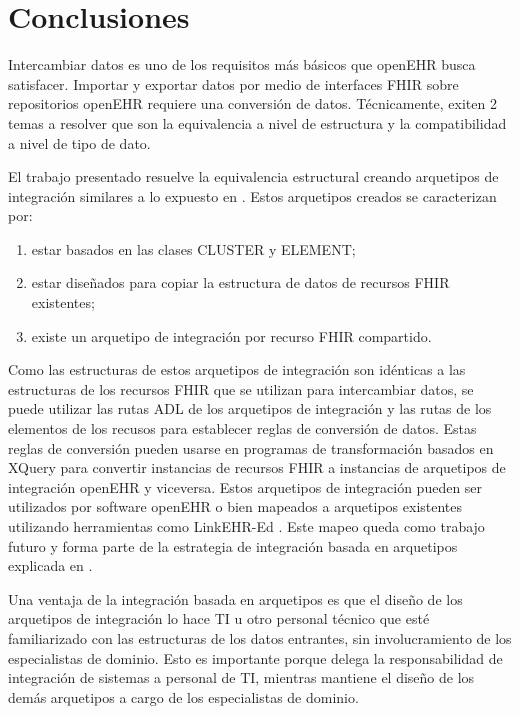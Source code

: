 \chapter{Conclusiones}

Intercambiar datos es uno de los requisitos más básicos que openEHR busca satisfacer. Importar y exportar datos por medio de interfaces FHIR sobre repositorios openEHR requiere una conversión de datos. Técnicamente, exiten 2 temas a resolver que son la equivalencia a nivel de estructura y la compatibilidad a nivel de tipo de dato.

El trabajo presentado resuelve la equivalencia estructural creando arquetipos de integración similares a lo expuesto en \cite{openEHRArchitecture}. Estos arquetipos creados se caracterizan por:

\begin{enumerate}
  \item estar basados en las clases CLUSTER y ELEMENT;
  \item estar diseñados para copiar la estructura de datos de recursos FHIR existentes;
  \item existe un arquetipo de integración por recurso FHIR compartido.
\end{enumerate}

Como las estructuras de estos arquetipos de integración son idénticas a las estructuras de los recursos FHIR que se utilizan para intercambiar datos, se puede utilizar las rutas ADL de los arquetipos de integración y las rutas de los elementos de los recusos para establecer reglas de conversión de datos. Estas reglas de conversión pueden usarse en programas de transformación basados en XQuery para convertir instancias de recursos FHIR a instancias de arquetipos de integración openEHR y viceversa. Estos arquetipos de integración pueden ser utilizados por software openEHR o bien mapeados a arquetipos existentes utilizando herramientas como LinkEHR-Ed \cite{Maldonado09}. Este mapeo queda como trabajo futuro y forma parte de la estrategia de integración basada en arquetipos explicada en \cite{openEHRIntegration}.

Una ventaja de la integración basada en arquetipos es que el diseño de los arquetipos de integración lo hace TI u otro personal técnico que esté familiarizado con las estructuras de los datos entrantes, sin involucramiento de los especialistas de dominio. Esto es importante porque delega la responsabilidad de integración de sistemas a personal de TI, mientras mantiene el diseño de los demás arquetipos a cargo de los especialistas de dominio.

